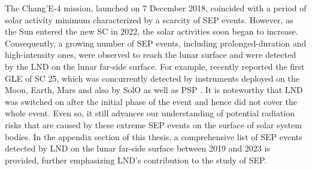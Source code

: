 


The Chang'E-4 mission, launched on 7 December 2018, coincided with a period of solar activity minimum characterized by a scarcity of \ac{SEP} events. However, as the Sun entered the new \acl{SC} in 2022, the solar activities soon began to increase. Consequently, a growing number of \ac{SEP} events, including prolonged-duration and high-intensity ones, were observed to reach the lunar surface and were detected by the \ac{LND} on the lunar far-side surface. For example, \citet{Guo2023GRL} recently reported the first \ac{GLE} of \ac{SC} 25, which was concurrently detected by instruments deployed on the Moon, Earth, Mars and also by \ac{SolO} as well as \ac{PSP} \citep{Papaioannou2022AA, Martucci2023SpWea, Chertok2022MNRAS}. It is noteworthy that \ac{LND} was switched on after the initial phase of the event and hence did not cover the whole event. Even so, it still advances our understanding of potential radiation risks that are caused by these extreme \ac{SEP} events on the surface of solar system bodies.
In the appendix section of this thesis, a comprehensive list of \ac{SEP} events detected by \ac{LND} on the lunar far-side surface between 2019 and 2023 is provided, further emphasizing \ac{LND}'s contribution to the study of \acs{SEP}.


